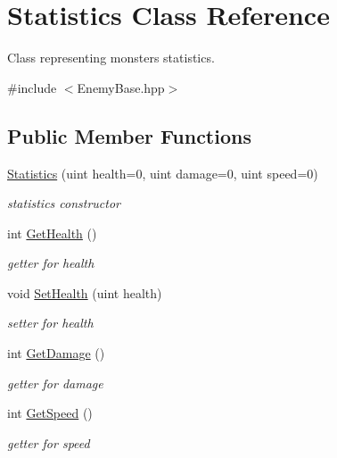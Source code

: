 \hypertarget{class_statistics}{}\section{Statistics Class Reference}
\label{class_statistics}


Class representing monster\textquotesingle{}s statistics.  




{\ttfamily \#include $<$Enemy\+Base.\+hpp$>$}

\subsection*{Public Member Functions}
\begin{DoxyCompactItemize}
\item 
\mbox{\hyperlink{class_statistics_a66445b3151e74a15b543437eb2633a72}{Statistics}} (uint health=0, uint damage=0, uint speed=0)
\begin{DoxyCompactList}\small\item\em statistics constructor \end{DoxyCompactList}\item 
\mbox{\label{class_statistics_a0a1a2e5163182a42349449a0a44145fb}} 
int \mbox{\hyperlink{class_statistics_a0a1a2e5163182a42349449a0a44145fb}{Get\+Health}} ()
\begin{DoxyCompactList}\small\item\em getter for health \end{DoxyCompactList}\item 
void \mbox{\hyperlink{class_statistics_a152114e1a7134507f3f1865f05ae6ac9}{Set\+Health}} (uint health)
\begin{DoxyCompactList}\small\item\em setter for health \end{DoxyCompactList}\item 
int \mbox{\hyperlink{class_statistics_a46693e6826f75d2b1b40c1ea34707096}{Get\+Damage}} ()
\begin{DoxyCompactList}\small\item\em getter for damage \end{DoxyCompactList}\item 
int \mbox{\hyperlink{class_statistics_a055c86f402070457d85468dc9c8e0b5a}{Get\+Speed}} ()
\begin{DoxyCompactList}\small\item\em getter for speed \end{DoxyCompactList}\item 

\end{DoxyCompactItemize}
